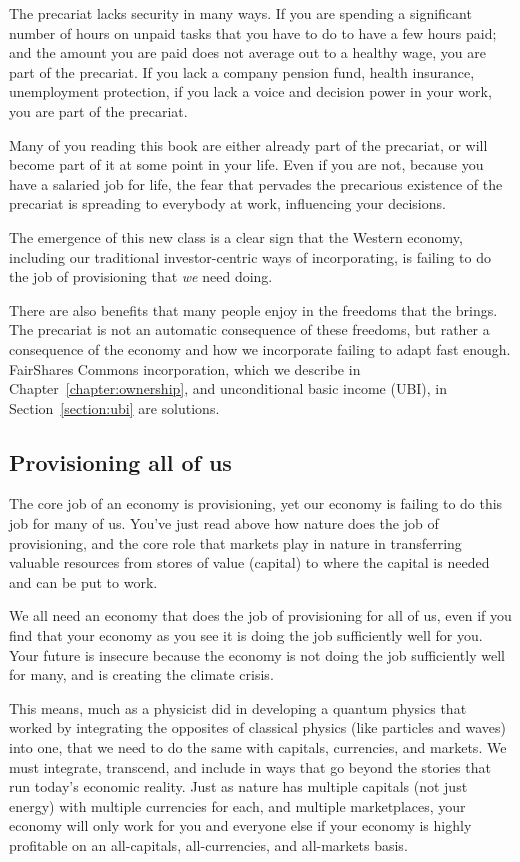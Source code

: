 The precariat lacks security in many ways. If you are spending a significant number of hours on unpaid tasks that you have to do to have a few hours paid; and the amount you are paid does not average out to a healthy wage, you are part of the precariat. If you lack a company pension fund, health insurance, unemployment protection, if you lack a voice and decision power in your work, you are part of the precariat.


Many of you reading this book are either already part of the precariat, or will become part of it at some point in your life. Even if you are not, because you have a salaried job for life, the fear that pervades the precarious existence of the precariat is spreading to everybody at work, influencing your decisions.


The emergence of this new class is a clear sign that the Western economy, including our traditional investor-centric ways of incorporating, is failing to do the job of provisioning that \emph{we} need doing. 


There are also benefits that many people enjoy in the freedoms that the  brings. The precariat is not an automatic consequence of these freedoms, but rather a consequence of the economy and how we incorporate failing to adapt fast enough. FairShares Commons incorporation, which we describe in Chapter~\ref{chapter:ownership}, and unconditional basic income (UBI), in Section~\ref{section:ubi} are solutions.


\subsection{Provisioning all of us}
The core job of an economy is provisioning, yet our economy is failing to do this job for many of us. You've just read above how nature does the job of provisioning, and the core role that markets play in nature in transferring valuable resources from stores of value (capital) to where the capital is needed and can be put to work. 


We all need an economy that does the job of provisioning for all of us, even if you find that your economy as you see it is doing the job sufficiently well for you. Your future is insecure because the economy is not doing the job sufficiently well for many, and is creating the climate crisis. 


This means, much as a physicist did in developing a quantum physics that worked by integrating the opposites of classical physics (like particles and waves) into one, that we need to do the same with capitals, currencies, and markets. We must integrate, transcend, and include in ways that go beyond the stories that run today's economic reality. Just as nature has multiple capitals (not just energy) with multiple currencies for each, and multiple marketplaces, your economy will only work for you and everyone else if your economy is highly profitable on an all-capitals, all-currencies, and all-markets basis.




